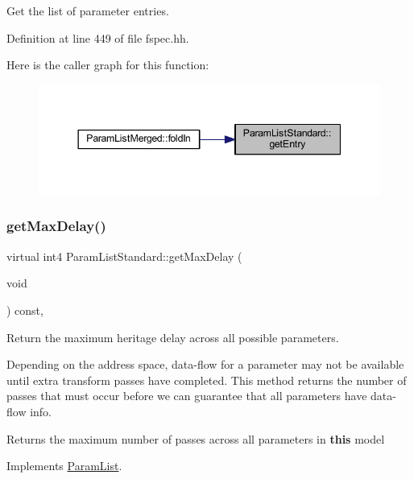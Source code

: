 Get the list of parameter entries. 



Definition at line 449 of file fspec.\+hh.

Here is the caller graph for this function\+:
\nopagebreak
\begin{figure}[H]
\begin{center}
\leavevmode
\includegraphics[width=344pt]{class_param_list_standard_a2aca7064239033441e64daf86c4de6d0_icgraph}
\end{center}
\end{figure}
\mbox{\label{class_param_list_standard_aeb0fe74f815ad09f021ace22eb60d06a}} 
\subsubsection{\texorpdfstring{getMaxDelay()}{getMaxDelay()}}
{\footnotesize\ttfamily virtual int4 Param\+List\+Standard\+::get\+Max\+Delay (\begin{DoxyParamCaption}\item[{void}]{ }\end{DoxyParamCaption}) const\hspace{0.3cm}{\ttfamily [inline]}, {\ttfamily [virtual]}}



Return the maximum heritage delay across all possible parameters. 

Depending on the address space, data-\/flow for a parameter may not be available until extra transform passes have completed. This method returns the number of passes that must occur before we can guarantee that all parameters have data-\/flow info. \begin{DoxyReturn}{Returns}
the maximum number of passes across all parameters in {\bfseries{this}} model 
\end{DoxyReturn}


Implements \mbox{\hyperlink{class_param_list_af3d5640d0912fca118219d8213ed3a28}{Param\+List}}.




